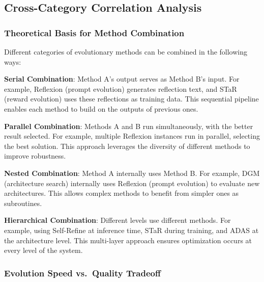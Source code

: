 \subsection{Cross-Category Correlation Analysis}\label{sec:cross-analysis}

\subsubsection{Theoretical Basis for Method Combination}

Different categories of evolutionary methods can be combined in the following ways:

\textbf{Serial Combination}: Method A's output serves as Method B's input. For example, Reflexion (prompt evolution) generates reflection text, and STaR (reward evolution) uses these reflections as training data. This sequential pipeline enables each method to build on the outputs of previous ones.

\textbf{Parallel Combination}: Methods A and B run simultaneously, with the better result selected. For example, multiple Reflexion instances run in parallel, selecting the best solution. This approach leverages the diversity of different methods to improve robustness.

\textbf{Nested Combination}: Method A internally uses Method B. For example, DGM (architecture search) internally uses Reflexion (prompt evolution) to evaluate new architectures. This allows complex methods to benefit from simpler ones as subroutines.

\textbf{Hierarchical Combination}: Different levels use different methods. For example, using Self-Refine at inference time, STaR during training, and ADAS at the architecture level. This multi-layer approach ensures optimization occurs at every level of the system.

\subsubsection{Evolution Speed vs.\ Quality Tradeoff}

